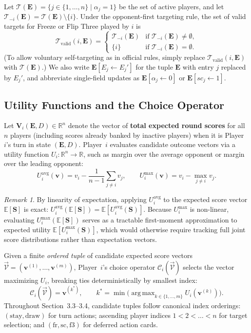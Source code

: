 \documentclass{article}
\theoremstyle{plain}
\theoremstyle{definition}
\theoremstyle{remark}
\newtheorem*{remark}{Remark}
\DeclareMathOperator*{\argmax}{arg\,max}
\begin{document}
Let $\mathcal{T}(\mathbf{E}) = \{j \in \{1, \dots, n\} \mid \alpha_j = 1\}$ be the set of active players, and let $\mathcal{T}_{-i}(\mathbf{E}) = \mathcal{T}(\mathbf{E}) \setminus \{i\}$. Under the opponent-first targeting rule, the set of valid targets for Freeze or Flip Three played by $i$ is
\[
    \mathcal{T}_{\text{valid}}(i, \mathbf{E}) =
    \begin{cases}
        \mathcal{T}_{-i}(\mathbf{E}) & \text{if } \mathcal{T}_{-i}(\mathbf{E}) \neq \emptyset, \\
        \{i\} & \text{if } \mathcal{T}_{-i}(\mathbf{E}) = \emptyset.
    \end{cases}
\]
(To allow voluntary self-targeting as in official rules, simply replace $\mathcal{T}_{\text{valid}}(i, \mathbf{E})$ with $\mathcal{T}(\mathbf{E})$.) We also write $\mathbf{E}[E_j \leftarrow E_j']$ for the tuple $\mathbf{E}$ with entry $j$ replaced by $E_j'$, and abbreviate single-field updates as $\mathbf{E}[\alpha_j \leftarrow 0]$ or $\mathbf{E}[sc_j \leftarrow 1]$.

\subsection{Utility Functions and the Choice Operator}
Let $\mathbf{V}_i(\mathbf{E}, D) \in \mathbb{R}^n$ denote the vector of \textbf{total expected round scores} for all $n$ players (including scores already banked by inactive players) when it is Player~$i$'s turn in state $(\mathbf{E}, D)$. Player~$i$ evaluates candidate outcome vectors via a utility function $U_i: \mathbb{R}^n \to \mathbb{R}$, such as margin over the average opponent or margin over the leading opponent:
\[
    U_i^{\text{avg}}(\mathbf{v}) = v_i - \frac{1}{n-1} \sum_{j \neq i} v_j, \qquad
    U_i^{\text{max}}(\mathbf{v}) = v_i - \max_{j \neq i} v_j.
\]
\begin{remark}
By linearity of expectation, applying $U_i^{\text{avg}}$ to the expected score vector $\mathbb{E}[\mathbf{S}]$ is exact: $U_i^{\text{avg}}(\mathbb{E}[\mathbf{S}]) = \mathbb{E}[U_i^{\text{avg}}(\mathbf{S})]$. Because $U_i^{\text{max}}$ is non-linear, evaluating $U_i^{\text{max}}(\mathbb{E}[\mathbf{S}])$ serves as a tractable first-moment approximation to expected utility $\mathbb{E}[U_i^{\text{max}}(\mathbf{S})]$, which would otherwise require tracking full joint score distributions rather than expectation vectors.
\end{remark}

Given a finite \textit{ordered tuple} of candidate expected score vectors $\vec{\mathcal{V}} = (\mathbf{v}^{(1)}, \dots, \mathbf{v}^{(m)})$, Player~$i$'s choice operator $\mathcal{C}_i(\vec{\mathcal{V}})$ selects the vector maximizing $U_i$, breaking ties deterministically by smallest index:
\[
    \mathcal{C}_i(\vec{\mathcal{V}}) = \mathbf{v}^{(k^*)}, \qquad
    k^* = \min \Big( \argmax_{k \in \{1, \dots, m\}} U_i(\mathbf{v}^{(k)}) \Big).
\]
Throughout Section~3.3--3.4, candidate tuples follow canonical index orderings: $(\text{stay}, \text{draw})$ for turn actions; ascending player indices $1 < 2 < \dots < n$ for target selection; and $(\text{fr}, \text{sc}, \text{f3})$ for deferred action cards.
\end{document}
